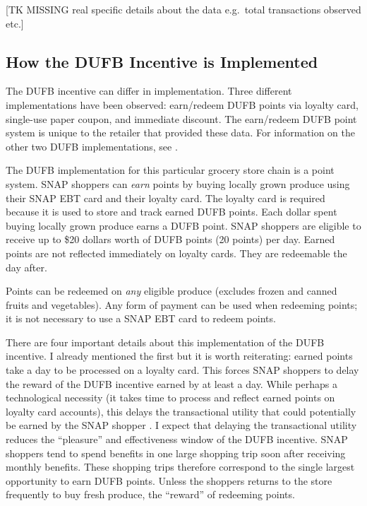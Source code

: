 \documentclass[12pt,letterpaperpaper,]{book}
\begin{document}
{[}TK MISSING real specific details about the data e.g.~total
transactions observed etc.{]}

\subsection*{How the DUFB Incentive is
Implemented}\label{how-the-dufb-incentive-is-implemented}

The DUFB incentive can differ in implementation. Three different
implementations have been observed: earn/redeem DUFB points via loyalty
card, single-use paper coupon, and immediate discount. The earn/redeem
DUFB point system is unique to the retailer that provided these data.
For information on the other two DUFB implementations, see
\citep{margaret_schnuck_doubling_2016}.

The DUFB implementation for this particular grocery store chain is a
point system. SNAP shoppers can \emph{earn} points by buying locally
grown produce using their SNAP EBT card and their loyalty card. The
loyalty card is required because it is used to store and track earned
DUFB points. Each dollar spent buying locally grown produce earns a DUFB
point. SNAP shoppers are eligible to receive up to \$20 dollars worth of
DUFB points (20 points) per day. Earned points are not reflected
immediately on loyalty cards. They are redeemable the day after.

Points can be redeemed on \emph{any} eligible produce (excludes frozen
and canned fruits and vegetables). Any form of payment can be used when
redeeming points; it is not necessary to use a SNAP EBT card to redeem
points.

There are four important details about this implementation of the DUFB
incentive. I already mentioned the first but it is worth reiterating:
earned points take a day to be processed on a loyalty card. This forces
SNAP shoppers to delay the reward of the DUFB incentive earned by at
least a day. While perhaps a technological necessity (it takes time to
process and reflect earned points on loyalty card accounts), this delays
the transactional utility that could potentially be earned by the SNAP
shopper \citep{thaler_mental_1985}. I expect that delaying the
transactional utility reduces the ``pleasure'' and effectiveness window
of the DUFB incentive. SNAP shoppers tend to spend benefits in one large
shopping trip soon after receiving monthly benefits. These shopping
trips therefore correspond to the single largest opportunity to earn
DUFB points. Unless the shoppers returns to the store frequently to buy
fresh produce, the ``reward'' of redeeming points.
\end{document}
